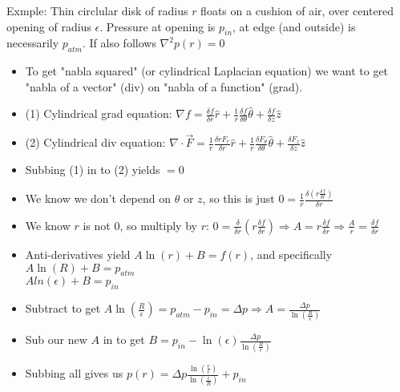 \documentclass[11pt, oneside]{article}   	%
\begin{document}
Exmple: Thin circlular disk of radius $r$ floats on a cushion of air, over centered opening of radius $\epsilon$.  Pressure at opening is $p_{in}$, at edge (and outside) is necessarily $p_{atm}$.  If also follows $\nabla^2 p(r) = 0$
\begin{itemize}
\item To get "nabla squared" (or cylindrical Laplacian equation) we want to get "nabla of a vector" (div) on "nabla of a function" (grad).
\item (1) Cylindrical grad equation: $\nabla f = \frac{\delta f}{\delta r} \hat{r} +   \frac{1}{r} \frac{\delta f}{\delta \theta} \hat{\theta} +  \frac{\delta f}{\delta z} \hat{z}$
\item (2) Cylindrical div equation: $\nabla \cdot \vec{F} = \frac{1}{r}\frac{\delta rF_r}{\delta r} \hat{r} +  \frac{1}{r} \frac{\delta F_\theta}{\delta \theta} \hat{\theta} +  \frac{\delta F_z}{\delta z} \hat{z}$
\item Subbing (1) in to (2) yields   $= 0$
\item We know we don't depend on $\theta$ or $z$, so this is just $0=\frac{1}{r}\frac{\delta (r\frac{\delta f}{\delta r})}{\delta r}$
\item We know $r$ is not 0, so multiply by $r$: $0 = \frac{\delta}{\delta r} (r\frac{\delta f}{\delta r}) \Rightarrow A = r\frac{\delta f}{\delta r}  \Rightarrow \frac{A}{r}=\frac{\delta f}{\delta r} $
\item Anti-derivatives yield $A\ln(r) + B = f(r)$, and specifically
\\
$A\ln(R) +B = p_{atm}$ 
\\
$Aln(\epsilon) +B = p_{in}$
\item Subtract to get $A\ln (\frac{R}{\epsilon}) =  p_{atm}-p_{in} = \Delta p \Rightarrow A = \frac{\Delta p}{\ln (\frac{R}{\epsilon})} $
\item Sub our new $A$ in to get $B = p_{in} - \ln(\epsilon) \frac{\Delta p}{\ln (\frac{R}{\epsilon})}$
\item Subbing all gives us $p(r) = \Delta p \frac
  {\ln(\frac{r}{\epsilon})}
  {\ln(\frac{\epsilon}{R})}+ p_{in}$
\end{itemize}
\end{document}
